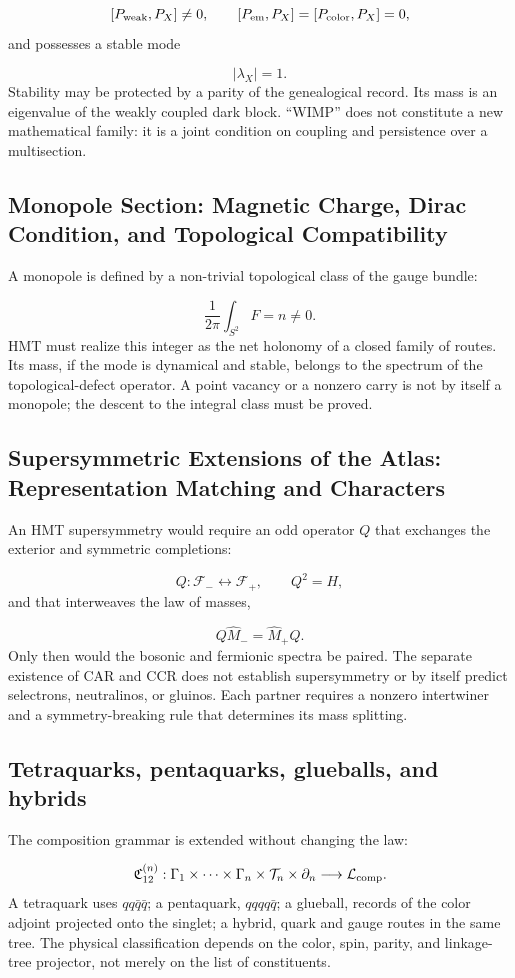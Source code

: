 \[
 [P_{\rm weak},P_X]\ne0,\qquad
 [P_{\rm em},P_X]=[P_{\rm color},P_X]=0,
\]
and possesses a stable mode

\[
 |\lambda_X|=1.
\]
Stability may be protected by a parity of the genealogical record. Its mass is an eigenvalue of the weakly coupled dark block. “WIMP” does not constitute a new mathematical family: it is a joint condition on coupling and persistence over a multisection.

\subsection{Monopole Section: Magnetic Charge, Dirac Condition, and Topological Compatibility}
A monopole is defined by a non-trivial topological class of the gauge bundle:

\[
 \frac1{2\pi}\int_{S^2}F=n\ne0.
\]
HMT must realize this integer as the net holonomy of a closed family of routes. Its mass, if the mode is dynamical and stable, belongs to the spectrum of the topological-defect operator. A point vacancy or a nonzero carry is not by itself a monopole; the descent to the integral class must be proved.

\subsection{Supersymmetric Extensions of the Atlas: Representation Matching and Characters}
An HMT supersymmetry would require an odd operator \(Q\) that exchanges the exterior and symmetric completions:

\[
 Q:\mathcal F_-\leftrightarrow\mathcal F_+,
\qquad
 Q^2=H,
\]
and that interweaves the law of masses,

\[
 Q\widehat M_-=\widehat M_+Q.
\]
Only then would the bosonic and fermionic spectra be paired. The separate existence of CAR and CCR does not establish supersymmetry or by itself predict selectrons, neutralinos, or gluinos. Each partner requires a nonzero intertwiner and a symmetry-breaking rule that determines its mass splitting.

\subsection{Tetraquarks, pentaquarks, glueballs, and hybrids}
The composition grammar is extended without changing the law:

\[
 \mathfrak C_{12}^{(n)}:
 \Gamma_1\times\cdots\times\Gamma_n
 \times\mathcal T_n\times\partial_n
 \longrightarrow\mathcal L_{\rm comp}.
\]
A tetraquark uses \(qq\bar q\bar q\); a pentaquark, \(qqqq\bar q\); a glueball, records of the color adjoint projected onto the singlet; a hybrid, quark and gauge routes in the same tree. The physical classification depends on the color, spin, parity, and linkage-tree projector, not merely on the list of constituents.

